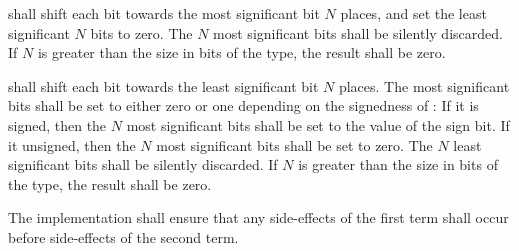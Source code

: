 \specsubsubitem
{} shall shift
each bit towards the most significant bit $N$ places, and set the least
significant $N$ bits to zero. The $N$ most significant bits shall be silently
discarded. If $N$ is greater than the size in bits of the type, the result shall
be zero.


\specsubsubitem
{} shall shift each bit towards the least significant bit $N$ places. The most
significant bits shall be set to either zero or one depending on the signedness
of : If it is signed, then the $N$ most
significant bits shall be set to the value of the sign bit. If it unsigned, then
the $N$ most significant bits shall be set to zero. The $N$ least significant
bits shall be silently discarded. If $N$ is greater than the size in bits of the
type, the result shall be zero.


\specsubsubitem
The implementation shall ensure that any side-effects of the first term shall
occur before side-effects of the second term.


\begin{grammar}
 \\
	 \\
	 \terminal{\&}  \\

 \\
	 \\
	 \terminal{\^}  \\

 \\
	 \\
	 \terminal{|}  \\
\end{grammar}

